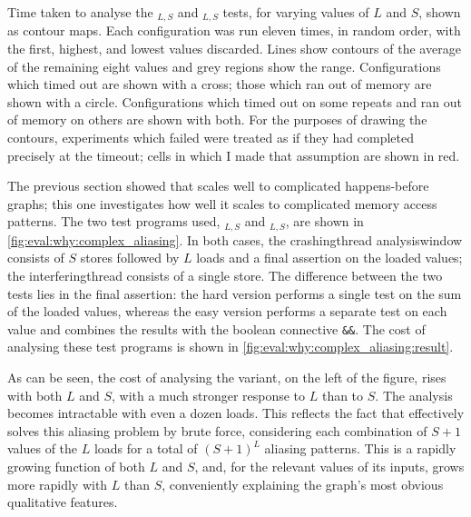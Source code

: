 \begin{sanefig}
  \caption{Time taken to analyse the
    $_{L,S}$ and
    $_{L,S}$ tests, for varying values
    of $L$ and $S$, shown as contour maps.  Each configuration was run
    eleven times, in random order, with the first, highest, and lowest
    values discarded.  Lines show contours of the average of the
    remaining eight values and grey regions show the range.
    Configurations which timed out are shown with a cross; those which
    ran out of memory are shown with a circle.  Configurations which
    timed out on some repeats and ran out of memory on others are
    shown with both.  For the purposes of drawing the contours,
    experiments which failed were treated as if they had completed
    precisely at the timeout; cells in which I made that assumption
    are shown in red.}
  \label{fig:eval:why:complex_aliasing:result1}
\end{sanefig}

\noindent
The previous section showed that {\implementation} scales well to
complicated happens-before graphs; this one investigates how well it
scales to complicated memory access patterns.  The two test programs
used, $_{L,S}$ and
$_{L,S}$, are shown in
\autoref{fig:eval:why:complex_aliasing}.  In both cases, the
\gls{crashingthread} \gls{analysiswindow} consists of $S$ stores
followed by $L$ loads and a final assertion on the loaded values; the
\gls{interferingthread} consists of a single store.  The difference
between the two tests lies in the final assertion: the hard version
performs a single test on the sum of the loaded values, whereas the
easy version performs a separate test on each value and combines the
results with the boolean connective \texttt{\&\&}.  The cost of
analysing these test programs is shown in
\autoref{fig:eval:why:complex_aliasing:result}.

As can be seen, the cost of analysing the  variant, on
the left of the figure, rises with both $L$ and $S$, with a much
stronger response to $L$ than to $S$.  The analysis becomes
intractable with even a dozen loads.  This reflects the fact that
{\implementation} effectively solves this aliasing problem by brute
force, considering each combination of $S+1$ values of the $L$ loads
for a total of $(S+1)^L$ aliasing patterns.  This is a rapidly growing
function of both $L$ and $S$, and, for the relevant values of its
inputs, grows more rapidly with $L$ than $S$, conveniently explaining
the graph's most obvious qualitative features.\kern-1pt

